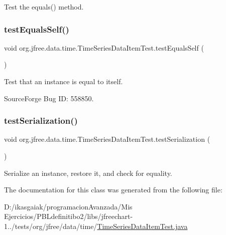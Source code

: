 Test the equals() method. \mbox{\label{classorg_1_1jfree_1_1data_1_1time_1_1_time_series_data_item_test_a180c03bcd3d3995a0345e41a44327ea7}} 
\subsubsection{\texorpdfstring{test\+Equals\+Self()}{testEqualsSelf()}}
{\footnotesize\ttfamily void org.\+jfree.\+data.\+time.\+Time\+Series\+Data\+Item\+Test.\+test\+Equals\+Self (\begin{DoxyParamCaption}{ }\end{DoxyParamCaption})}

Test that an instance is equal to itself.

Source\+Forge Bug ID\+: 558850. \mbox{\label{classorg_1_1jfree_1_1data_1_1time_1_1_time_series_data_item_test_a7dba893ce8a571ee4eebec0793ff3e98}} 
\subsubsection{\texorpdfstring{test\+Serialization()}{testSerialization()}}
{\footnotesize\ttfamily void org.\+jfree.\+data.\+time.\+Time\+Series\+Data\+Item\+Test.\+test\+Serialization (\begin{DoxyParamCaption}{ }\end{DoxyParamCaption})}

Serialize an instance, restore it, and check for equality. 

The documentation for this class was generated from the following file\+:\begin{DoxyCompactItemize}
\item 
D\+:/ikasgaiak/programacion\+Avanzada/\+Mis Ejercicios/\+P\+B\+Ldefinitibo2/libs/jfreechart-\/1../tests/org/jfree/data/time/\mbox{\hyperlink{_time_series_data_item_test_8java}{Time\+Series\+Data\+Item\+Test.\+java}}\end{DoxyCompactItemize}
